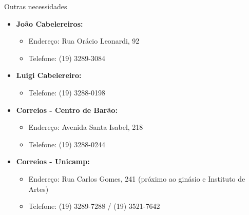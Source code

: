 \begin{story}{Outras necessidades}
\begin{itemize}
\item \textbf{João Cabelereiros:}
\begin{itemize}
\item Endereço: Rua Orácio Leonardi, 92
\item Telefone: (19) 3289-3084
\end{itemize}

\item \textbf{Luigi Cabelereiro:}
\begin{itemize}
\item Telefone: (19) 3288-0198
\end{itemize}

\item \textbf{Correios - Centro de Barão:}
\begin{itemize}
\item Endereço: Avenida Santa Isabel, 218
\item Telefone: (19) 3288-0244
\end{itemize}

\item \textbf{Correios - Unicamp:}
\begin{itemize}
\item Endereço: Rua Carlos Gomes, 241 (próximo ao ginásio e Instituto de Artes)
\item Telefone: (19) 3289-7288 / (19) 3521-7642
\end{itemize}

\end{itemize}

\end{story}